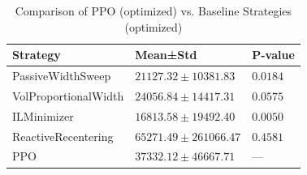 \begin{table}
\caption{Comparison of PPO (optimized) vs. Baseline Strategies (optimized)}
\label{tab:baseline_comparison_fair}
\begin{tabular}{lll}
\toprule
Strategy & Mean±Std & P-value \\
\midrule
PassiveWidthSweep & $21127.32 \pm 10381.83$ & $0.0184$ \\
VolProportionalWidth & $24056.84 \pm 14417.31$ & $0.0575$ \\
ILMinimizer & $16813.58 \pm 19492.40$ & $0.0050$ \\
ReactiveRecentering & $65271.49 \pm 261066.47$ & $0.4581$ \\
PPO & $37332.12 \pm 46667.71$ & — \\
\bottomrule
\end{tabular}
\end{table}
